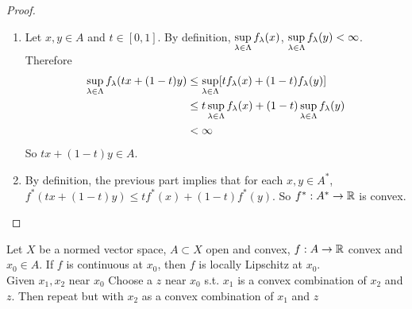 \documentclass{book}
\begin{document}
	\begin{proof}
		\begin{enumerate}
			\item Let $x, y \in A$ and $t \in [0,1]$. By definition, $ \sup\limits_{\lambda \in \Lambda} f_{\lambda}(x)$,  $\sup\limits_{\lambda \in \Lambda} f_{\lambda}(y) < \infty$. Therefore 
			\begin{align*}
				 \sup\limits_{\lambda \in \Lambda} f_{\lambda}(tx + (1-t)y) 
				&\leq \sup\limits_{\lambda \in \Lambda} [tf_{\lambda}(x) + (1-t)f_{\lambda}(y) ]  \\
				& \leq t \sup\limits_{\lambda \in \Lambda} f_{\lambda}(x) + (1-t) \sup\limits_{\lambda \in \Lambda} f_{\lambda}(y) \\
				& < \infty
			\end{align*}
			So $tx + (1-t)y \in A$.
			\item  By definition, the previous part implies that for each $x,y \in A^*$, $f^*(tx + (1-t)y) \leq t f^*(x) + (1-t)f^*(y)$. So $f^*:A^* \rightarrow \mathbb{R}$ is convex.
		\end{enumerate}
	\end{proof}
	
	
	
	
	\begin{ex} 
	Let $X$ be a normed vector space, $A \subset X$ open and convex, $f:A \rightarrow \mathbb{R}$ convex and $x_0 \in A$. If $f$ is continuous at $x_0$, then $f$ is locally Lipschitz at $x_0$. \\
	 Given $x_1, x_2$ near $x_0$ Choose a $z$ near $x_0$ s.t. $x_1$ is a convex combination of $x_2$ and $z$. Then repeat but with $x_2$ as a convex combination of $x_1$ and $z$
	\end{ex}
	
\end{document}
